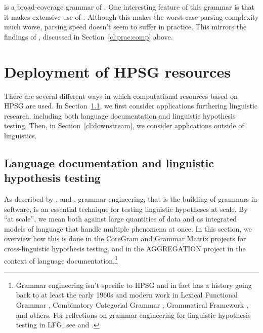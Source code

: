 \documentclass[output=paper,nonflat]{langsci/langscibook}
\begin{document}
 is a broad-coverage grammar of  \citep{Babel,Mueller99a}.
One interesting feature of this grammar is that
it makes extensive use of  \citep{Mueller2004b}.
Although this makes the worst-case parsing complexity much worse,
parsing speed doesn't seem to suffer in practice.
This mirrors the findings of \citet{Carroll94},
discussed in Section~\ref{cl:prac:comp} above.






\section{Deployment of HPSG resources}
\label{cl:deployment}

There are several different ways in which computational resources
based on HPSG are used.
In Section~\ref{cl:lang-doc}, we first consider applications furthering linguistic research,
including both language documentation and linguistic hypothesis testing.
Then, in Section~\ref{cl:downstream}, we consider applications outside of linguistics.


\subsection{Language documentation and linguistic hypothesis testing}
\label{cl:lang-doc}


As described by \citet{Mueller99a}, \citet{Bender2008c} and \citet{BFO2011a-u},
grammar engineering, that is the building of grammars in software, is
an essential technique for testing linguistic hypotheses at scale. By
``at scale'', we mean both against large quantities of data and as
integrated models of language that handle multiple phenomena at
once. In this section, we overview how this is done in the CoreGram
and Grammar Matrix projects for cross-linguistic hypothesis testing,
and in the AGGREGATION project in the context of language
documentation.\footnote{Grammar engineering isn't specific to HPSG and
in fact has a history going back to at least the early 1960s \citep{Kay:63,ZFHW65a,Petrick65a-u,FBDPM71a-u}
and modern work in Lexical Functional Grammar \citep{BKNS99a-ed}, Combinatory Categorial
Grammar \citep{BCPW2007a}, Grammatical Framework \citep{Ranta:09}, and others.
For reflections on grammar engineering for linguistic hypothesis testing
in LFG, see \citealt{BKNS99a-ed} and \citealt{King:16}.}
\end{document}
